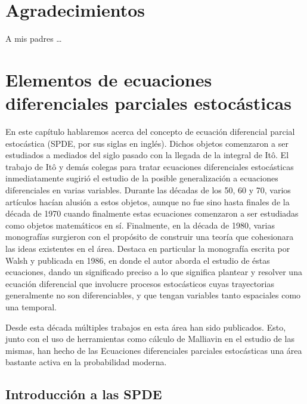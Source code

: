 \documentclass[letterpaper,twoside,12pt]{book}
\newcommand{\1}{\mathds{1}}
\theoremstyle{definition}
\theoremstyle{definition}
\theoremstyle{remark}
\theoremstyle{definition}
\theoremstyle{definition}
\theoremstyle{definition}
\theoremstyle{definition}
\theoremstyle{definition}
\begin{document}
\chapter*{Agradecimientos}

A mis padres \ldots

\tableofcontents







\mainmatter

\chapter{Elementos de ecuaciones diferenciales parciales estocásticas}

En este capítulo hablaremos acerca del concepto de ecuación diferencial parcial estocástica (SPDE, por sus siglas en inglés).
Dichos objetos comenzaron a ser estudiados a mediados del siglo pasado con la llegada de la integral de Itô.
El trabajo de Itô y demás colegas para tratar ecuaciones diferenciales estocásticas inmediatamente sugirió el estudio de la posible generalización a ecuaciones diferenciales en varias variables.
Durante las décadas de los 50, 60 y 70, varios artículos hacían alusión a estos objetos, aunque no fue sino hasta finales de la década de 1970 cuando finalmente estas ecuaciones comenzaron a ser estudiadas como objetos matemáticos en sí.
Finalmente, en la década de 1980, varias monografías surgieron con el propósito de construir una teoría que cohesionara las ideas existentes en el área. Destaca en particular la monografía escrita por Walsh \cite{Walsh_J.B_Introduction_to_SPDEs} y publicada en 1986, en donde el autor aborda el estudio de éstas ecuaciones, dando un significado preciso a lo que significa plantear y resolver una ecuación diferencial que involucre procesos estocásticos cuyas trayectorias generalmente no son diferenciables, y que tengan variables tanto espaciales como una temporal.

Desde esta década múltiples trabajos en esta área han sido publicados. Esto, junto con el uso de herramientas como cálculo de Malliavin en el estudio de las mismas, han hecho de las Ecuaciones diferenciales parciales estocásticas una área bastante activa en la probabilidad moderna. 

\section{Introducción a las SPDE}
\end{document}

